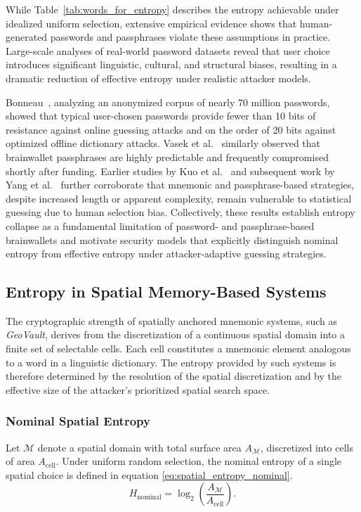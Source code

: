 \documentclass[journal,article,submit,pdftex,moreauthors]{Definitions/mdpi}
\begin{document}
While Table~\ref{tab:words_for_entropy} describes the entropy achievable under idealized uniform selection, extensive empirical evidence shows that human-generated passwords and passphrases violate these assumptions in practice. Large-scale analyses of real-world password datasets reveal that user choice introduces significant linguistic, cultural, and structural biases, resulting in a dramatic reduction of effective entropy under realistic attacker models.

Bonneau~\cite{Bonneau2012}, analyzing an anonymized corpus of nearly 70 million passwords, showed that typical user-chosen passwords provide fewer than 10 bits of resistance against online guessing attacks and on the order of 20 bits against optimized offline dictionary attacks. Vasek et al.~\cite{Vasek2017} similarly observed that brainwallet passphrases are highly predictable and frequently compromised shortly after funding. Earlier studies by Kuo et al.~\cite{Kuo2006} and subsequent work by Yang et al.~\cite{Yang2016} further corroborate that mnemonic and passphrase-based strategies, despite increased length or apparent complexity, remain vulnerable to statistical guessing due to human selection bias. Collectively, these results establish entropy collapse as a fundamental limitation of password- and passphrase-based brainwallets and motivate security models that explicitly distinguish nominal entropy from effective entropy under attacker-adaptive guessing strategies.

\subsection{Entropy in Spatial Memory-Based Systems}

The cryptographic strength of spatially anchored mnemonic systems, such as \textit{GeoVault}, derives from the discretization of a continuous spatial domain into a finite set of selectable cells. Each cell constitutes a mnemonic element analogous to a word in a linguistic dictionary. The entropy provided by such systems is therefore determined by the resolution of the spatial discretization and by the effective size of the attacker’s prioritized spatial search space.

\subsubsection{Nominal Spatial Entropy}

Let $\mathcal{M}$ denote a spatial domain with total surface area $A_{\mathcal{M}}$, discretized into cells of area $A_{\text{cell}}$. Under uniform random selection, the nominal entropy of a single spatial choice is defined in equation \ref{eq:spatial_entropy_nominal}.
\begin{equation}
H_{\text{nominal}} = \log_2\!\left(\frac{A_{\mathcal{M}}}{A_{\text{cell}}}\right).
\label{eq:spatial_entropy_nominal}
\end{equation}
\end{document}
